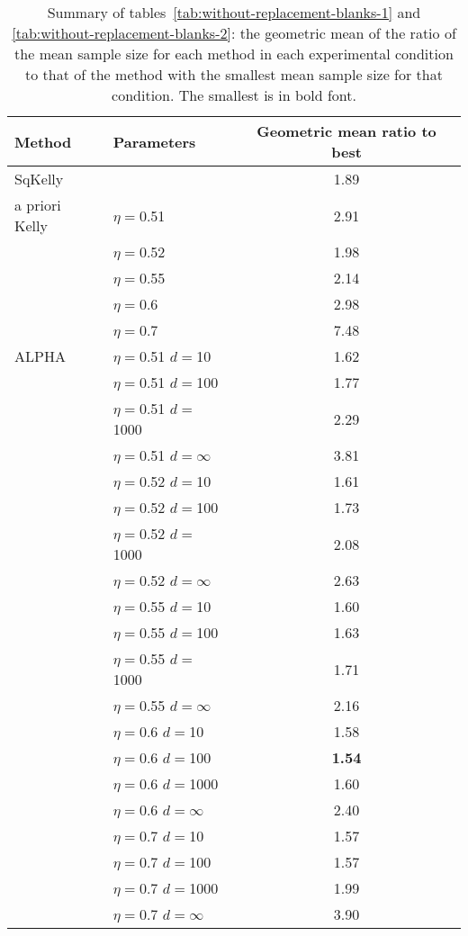 \documentclass[12pt,runningheads]{llncs}
\begin{document}
{\begin{table}
\begin{tabular}{llc}\\ 
Method & Parameters & Geometric mean ratio to best\\
\hline SqKelly & & 1.89 \\ 
 \hline a priori Kelly 
 & $\eta=$0.51 & 2.91 \\
 & $\eta=$0.52 & 1.98 \\
 & $\eta=$0.55 & 2.14 \\
 & $\eta=$0.6 & 2.98 \\
 & $\eta=$0.7 & 7.48 \\
\hline ALPHA 
 & $\eta=$0.51 $d=$10 & 1.62 \\ 
 & $\eta=$0.51 $d=$100 & 1.77 \\ 
 & $\eta=$0.51 $d=$1000 & 2.29 \\ 
 & $\eta=$0.51 $d=\infty$ & 3.81 \\
\cline{2-3}
 & $\eta=$0.52 $d=$10 & 1.61 \\ 
 & $\eta=$0.52 $d=$100 & 1.73 \\ 
 & $\eta=$0.52 $d=$1000 & 2.08 \\ 
 & $\eta=$0.52 $d=\infty$ & 2.63 \\
\cline{2-3}
 & $\eta=$0.55 $d=$10 & 1.60 \\ 
 & $\eta=$0.55 $d=$100 & 1.63 \\ 
 & $\eta=$0.55 $d=$1000 & 1.71 \\ 
 & $\eta=$0.55 $d=\infty$ & 2.16 \\
\cline{2-3}
 & $\eta=$0.6 $d=$10 & 1.58 \\ 
 & $\eta=$0.6 $d=$100 & \bf{1.54} \\ 
 & $\eta=$0.6 $d=$1000 & 1.60 \\ 
 & $\eta=$0.6 $d=\infty$ & 2.40 \\
\cline{2-3}
 & $\eta=$0.7 $d=$10 & 1.57 \\ 
 & $\eta=$0.7 $d=$100 & 1.57 \\ 
 & $\eta=$0.7 $d=$1000 & 1.99 \\ 
 & $\eta=$0.7 $d=\infty$ & 3.90 \end{tabular}
\caption{\protect \label{tab:summary}
Summary of tables~\ref{tab:without-replacement-blanks-1} and \ref{tab:without-replacement-blanks-2}:
the geometric mean of the ratio of the mean sample size for each method in each experimental condition to
that of the method with the smallest mean sample size for that condition.
The smallest is in bold font.
}
\end{table}


}
\end{document}
